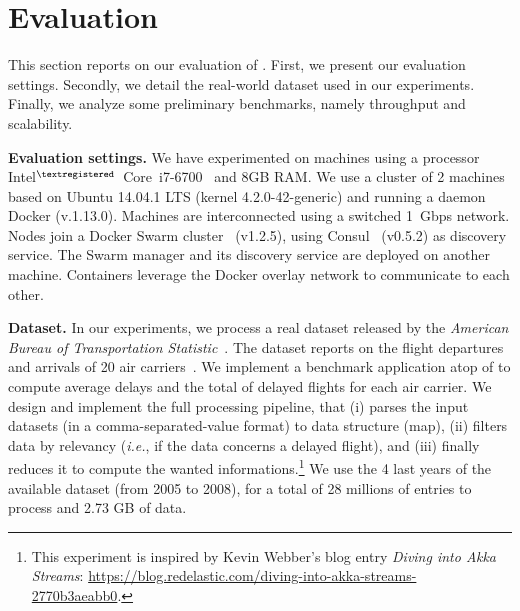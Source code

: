 \section{Evaluation}
\label{sec:eval}


This section reports on our evaluation of \SYS.
First, we present our evaluation settings.
Secondly, we detail the real-world dataset used in our experiments.
Finally, we analyze some preliminary benchmarks, namely throughput and scalability.


\textbf{Evaluation settings.}
We have experimented on machines using a processor Intel$^{\tiny{\textregistered}}$~Core\texttrademark~i7-6700~\cite{intel:i7_6700} and 8GB RAM.
We use a cluster of 2 machines based on Ubuntu 14.04.1 LTS (kernel 4.2.0-42-generic) and running a daemon Docker (v.1.13.0).
Machines are interconnected using a switched 1~Gbps network.
Nodes join a Docker Swarm cluster~\cite{docker:swarm_2016} (v1.2.5), using Consul~\cite{consul} (v0.5.2) as discovery service.
The Swarm manager and its discovery service are deployed on another machine.
Containers leverage the Docker overlay network to communicate to each other.



\textbf{Dataset.}
In our experiments, we process a real dataset released by the \emph{American Bureau of Transportation Statistic}~\cite{rita:bts}.
The dataset reports on the flight departures and arrivals of 20 air carriers~\cite{statistical_computing:data}.
We implement a benchmark application atop of \SYS to compute average delays and the total of delayed flights for each air carrier.
We design and implement the full processing pipeline, that (i) parses the input datasets (in a comma-separated-value format) to data structure (\textsf{map}), (ii) filters data by relevancy (\emph{i.e.}, if the data concerns a delayed flight), and (iii) finally reduces it to compute the wanted informations.\footnote{This experiment is inspired by Kevin Webber's blog entry \emph{Diving into Akka Streams}: \url{https://blog.redelastic.com/diving-into-akka-streams-2770b3aeabb0}.}
We use the 4 last years of the available dataset (from 2005 to 2008), for a total of 28 millions of entries to process and 2.73 GB of data.


